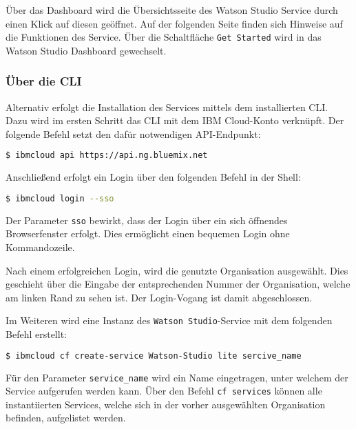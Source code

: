 Über das Dashboard wird die Übersichtsseite des Watson Studio Service durch einen Klick auf diesen geöffnet. Auf der
folgenden Seite finden sich Hinweise auf die Funktionen des Service. Über die Schaltfläche \texttt{Get Started} wird in
das Watson Studio Dashboard gewechselt.

\subsubsection*{Über die CLI}
Alternativ erfolgt die Installation des Services mittels dem installierten CLI. Dazu wird im ersten Schritt das CLI mit
dem IBM Cloud-Konto verknüpft. Der folgende Befehl setzt den dafür notwendigen API-Endpunkt:

\begin{lstlisting}[language=bash, caption=Setzen des API Targets, label=Setzen des API Targets]
    $ ibmcloud api https://api.ng.bluemix.net
\end{lstlisting}

Anschließend erfolgt ein Login über den folgenden Befehl in der Shell:

\begin{lstlisting}[language=bash, caption=Login über CLI und Single Sign-on, label=Login über CLI und SSO]
    $ ibmcloud login --sso
\end{lstlisting}

Der Parameter \texttt{sso} bewirkt, dass der Login über ein sich öffnendes Browserfenster erfolgt. Dies ermöglicht einen
bequemen Login ohne Kommandozeile.

Nach einem erfolgreichen Login, wird die genutzte Organisation ausgewählt. Dies geschieht über die Eingabe der
entsprechenden Nummer der Organisation, welche am linken Rand zu sehen ist. Der Login-Vogang ist damit abgeschlossen.

Im Weiteren wird eine Instanz des \texttt{Watson Studio}-Service mit dem folgenden Befehl erstellt:

\begin{lstlisting}[language=bash, caption=Instanziierung des Watson Studio Services, label=Instanziierung des Watson Studio Services]
    $ ibmcloud cf create-service Watson-Studio lite sercive_name
\end{lstlisting}

Für den Parameter \texttt{service\_name} wird ein Name eingetragen, unter welchem der Service aufgerufen werden kann.
Über den Befehl \texttt{cf services} können alle instantiierten Services, welche sich in der vorher ausgewählten
Organisation befinden, aufgelistet werden.

